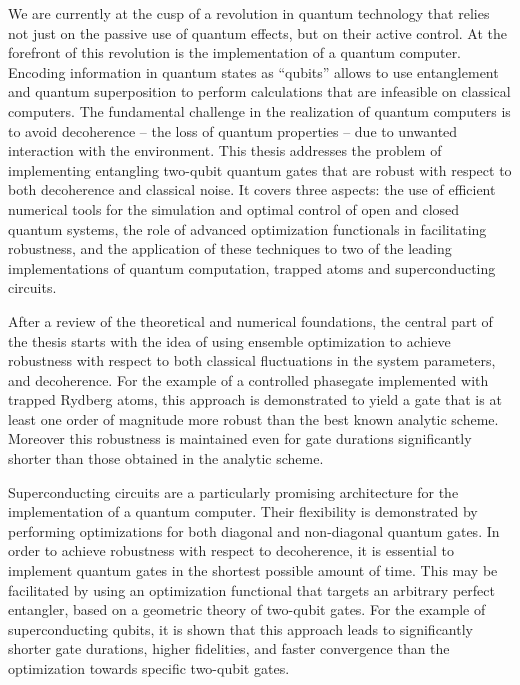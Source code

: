 
We are currently at the cusp of a revolution in quantum technology that relies
not just on the passive use of quantum effects, but on their active control.
At the forefront of this revolution is the implementation of a
quantum computer. Encoding information in quantum states as ``qubits'' allows to
use entanglement and quantum superposition to perform calculations that are
infeasible on classical computers.  The fundamental challenge in the realization
of quantum computers is to avoid decoherence -- the loss of quantum properties --
due to unwanted interaction with the environment. This thesis
addresses the problem of implementing entangling two-qubit quantum gates that
are robust with respect to both decoherence and classical noise. It covers three
aspects: the use of efficient numerical tools for the simulation and optimal
control of open and closed quantum systems, the role of advanced optimization
functionals in facilitating robustness, and the application of these techniques
to two of the leading implementations of quantum computation, trapped atoms and
superconducting circuits.

After a review of the theoretical and numerical foundations, the central part of
the thesis starts with the idea of using ensemble optimization to achieve
robustness with respect to both classical fluctuations in the system parameters,
and decoherence. For the example of a controlled phasegate implemented with
trapped Rydberg atoms, this approach is demonstrated to yield a gate that is at
least one order of magnitude more robust than the best known analytic scheme.
Moreover this robustness is maintained even for gate durations significantly
shorter than those obtained in the analytic scheme.

Superconducting circuits are a particularly promising architecture for the
implementation of a quantum computer. Their flexibility is demonstrated by
performing optimizations for both diagonal and non-diagonal quantum gates. In
order to achieve robustness with respect to decoherence, it is essential to
implement quantum gates in the shortest possible amount of time.  This may be
facilitated by using an optimization functional that targets an arbitrary
perfect entangler, based on a geometric theory of two-qubit gates. For the
example of superconducting qubits, it is shown that this approach leads to
significantly shorter gate durations, higher fidelities, and faster convergence
than the optimization towards specific two-qubit gates.

